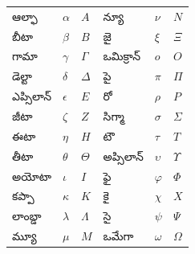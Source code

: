 \documentclass[../../../include/open-logic-chapter]{subfiles}
\begin{document}

\begin{center}
    \begin{tabular}{lll@{\qquad}lll}
    ఆల్ఫా &	$\alpha$ & $A$ &
    న్యూ & $\nu$ & $N$ \\
    బీటా & $\beta$ & $B$ &
    జై & $\xi$ & $\Xi$ \\
    గామా &	$\gamma$ & $\Gamma$ &
    ఒమిక్రాన్ & $o$ & $O$ \\
    డెల్టా & $\delta$ & $\Delta$ &
    పై & $\pi$ & $\Pi$ \\
    ఎప్సిలాన్ & $\epsilon$ & $E$ &
    రో & $\rho$ & $P$ \\
    జీటా & $\zeta$ & $Z$ &
    సిగ్మా &	$\sigma$ & $\Sigma$ \\
    ఈటా & $\eta$ & $H$ &
    టౌ & $\tau$ & $T$ \\
    తీటా & $\theta$ & $\Theta$ &
    అప్సిలాన్ & $\upsilon$ & $\Upsilon$ \\
    అయోటా & $\iota$ & $I$ &
    ఫై & $\varphi$ & $\Phi$ \\
    కప్పా & $\kappa$ & $K$ &
    కై & $\chi$ & $X$ \\
    లాంబ్డా & $\lambda$ & $\Lambda$ &
    సై & $\psi$ & $\Psi$ \\
    మ్యూ & $\mu$ & $M$ &
    ఒమేగా & $\omega$ & $\Omega$
    \end{tabular}
\end{center}
\end{document}
